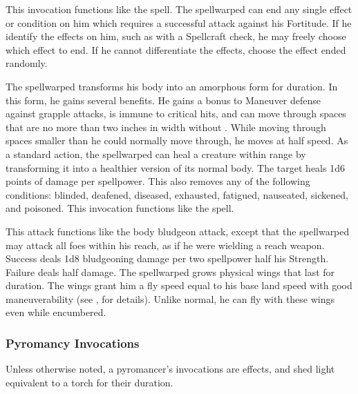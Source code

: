             This invocation functions like the  spell.
            The spellwarped can end any single effect or condition on him which requires a successful attack against his Fortitude.
            If he identify the effects on him, such as with a Spellcraft check, he may freely choose which effect to end.
            If he cannot differentiate the effects, choose the effect ended randomly.

            The spellwarped transforms his body into an amorphous form for \durshort duration.
            In this form, he gains several benefits.
            He gains a  bonus to Maneuver defense against grapple attacks, is immune to critical hits, and can move through spaces that are no more than two inches in width without .
            While moving through spaces smaller than he could normally move through, he moves at half speed.
            As a standard action, the spellwarped can heal a creature within \rngclose range by transforming it into a healthier version of its normal body.
            The target heals 1d6 points of damage per spellpower.
            This also removes any of the following conditions: blinded, deafened, diseased, exhausted, fatigued, nauseated, sickened, and poisoned.
            This invocation functions like the  spell.

            This attack functions like the body bludgeon attack, except that the spellwarped may attack all foes within his reach, as if he were wielding a reach weapon.
            Success deals 1d8 bludgeoning damage per two spellpower \add half his Strength.
            Failure deals half damage.
            The spellwarped grows physical wings that last for \durshort duration.
            The wings grant him a fly speed equal to his base land speed with good maneuverability (see , for details).
            Unlike normal, he can fly with these wings even while encumbered.

        \subsubsection{Pyromancy Invocations}
            Unless otherwise noted, a pyromancer's invocations are  effects, and shed light equivalent to a torch for their duration.

